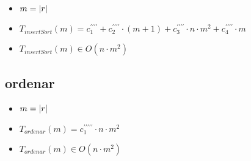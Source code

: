 \documentclass{article}
\begin{document}
    \begin{minipage}{0.70\textwidth}
        
    \end{minipage}
    \hfill
    \begin{minipage}{0.25\textwidth}
    \end{minipage}

    \begin{itemize}
        \item $m = |r|$
        \item $T_{insertSort}(m) = c^{\prime\prime\prime\prime}_1 +
                                   c^{\prime\prime\prime\prime}_2 \cdot (m+1) +
                                   c^{\prime\prime\prime\prime}_3 \cdot n \cdot m^2 +
                                   c^{\prime\prime\prime\prime}_4 \cdot m$
        \item $T_{insertSort}(m) \in O(n \cdot m^{2})$
    \end{itemize}

    \subsection*{ordenar}

    \begin{minipage}{0.70\textwidth}
        
    \end{minipage}
    \hfill
    \begin{minipage}{0.25\textwidth}
    \end{minipage}

    \begin{itemize}
        \item $m = |r|$
        \item $T_{ordenar}(m) = c^{\prime\prime\prime\prime\prime}_1 \cdot n \cdot m^2$
        \item $T_{ordenar}(m) \in O(n \cdot m^{2})$
    \end{itemize}
\end{document}
